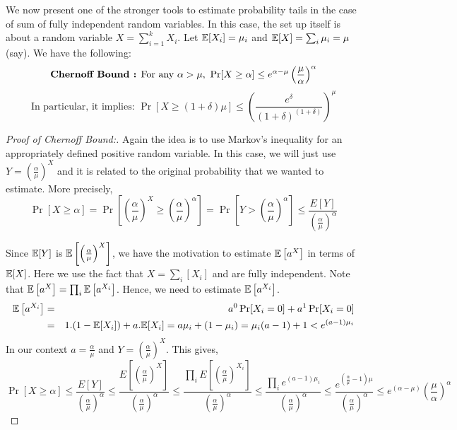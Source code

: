 \begin{description}
We now present one of the stronger tools to estimate probability tails in the case of sum of fully independent random variables. In this case, the set up itself is about a random variable $X = \sum_{i=1}^k X_i$. Let ${\mathbb E}[X_i] = \mu_i$ and ${\mathbb E}[X] = \sum_i \mu_i = \mu$ (say). We have the following:
$$\textrm{{\bf Chernoff Bound :} For any $\alpha > \mu$, } \Pr[X \ge \alpha] \le e^{\alpha-\mu}\left(\frac{\mu}{\alpha}\right)^\alpha$$
$$\textrm{In particular, it implies: } \Pr[X \ge (1+\delta)\mu] \le \left( \frac{e^{\delta}}{\left(1+\delta\right)^{(1+\delta)}} \right)^\mu$$

\begin{proof}[Proof of Chernoff Bound:]
Again the idea is to use Markov's inequality for an appropriately defined positive random variable. In this case, we will just use $Y = \left(\frac{\alpha}{\mu}\right)^X$ and it is related to the original probability that we wanted to estimate. More precisely, 
$$\Pr[X \ge \alpha] = \Pr\left[\left(\frac{\alpha}{\mu}\right)^X \ge \left(\frac{\alpha}{\mu}\right)^\alpha\right] = \Pr\left[Y > \left(\frac{\alpha}{\mu}\right)^\alpha\right] \le \frac{E[Y]}{\left(\frac{\alpha}{\mu}\right)^\alpha}$$

Since ${\mathbb E}[Y]$ is ${\mathbb E}\left[\left(\frac{\alpha}{\mu}\right)^X\right]$, we have the motivation to estimate ${\mathbb E}\left[a^X\right]$ in terms of ${\mathbb E}[X]$. Here we use the fact that $X = \sum_i[X_i]$ and are fully independent. Note that ${\mathbb E}\left[a^X\right] =  \prod_i {\mathbb E}\left[a^{X_i}\right]$. Hence, we need to estimate ${\mathbb E}\left[a^{X_i}\right]$.
\begin{eqnarray*}
{\mathbb E}\left[a^{X_i}\right] & = & a^0\Pr[X_i=0]+a^1\Pr[X_i=0] \\
& = & 1.(1-{\mathbb E}[X_i])+a.{\mathbb E}[X_i] = a\mu_i+(1-\mu_i) = \mu_i(a-1)+1 < e^{(a-1)\mu_i}
\end{eqnarray*}
In our context $a = \frac{\alpha}{\mu}$ and $Y = \left(\frac{\alpha}{\mu}\right)^X$. This gives, 
$$\Pr[X \ge \alpha] 
\le \frac{E[Y]}{\left(\frac{\alpha}{\mu}\right)^\alpha}
\le \frac{E\left[\left(\frac{\alpha}{\mu}\right)^X\right]}{\left(\frac{\alpha}{\mu}\right)^\alpha}
\le \frac{\prod_i E\left[\left(\frac{\alpha}{\mu}\right)^{X_i}\right]}{\left(\frac{\alpha}{\mu}\right)^\alpha}
\le \frac{\prod_i e^{(a-1)\mu_i}}{\left(\frac{\alpha}{\mu}\right)^\alpha}
\le \frac{e^{(\frac{\alpha}{\mu}-1)\mu}}{\left(\frac{\alpha}{\mu}\right)^\alpha}
\le e^{(\alpha-\mu)}\left(\frac{\mu}{\alpha}\right)^\alpha
$$
\end{proof}
\end{description}

